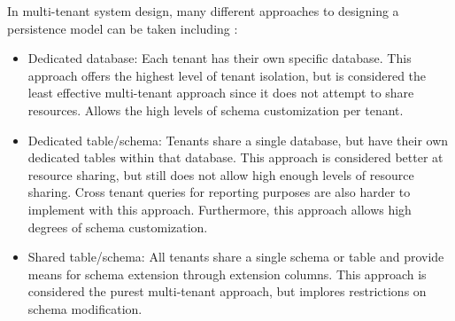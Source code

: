 In multi-tenant system design, many different approaches to designing a persistence model can be taken including \cite{Krebs2012}:

\begin{itemize}
\item Dedicated database: Each tenant has their own specific database. This approach offers the highest level of tenant isolation, but is considered the least effective multi-tenant approach since it does not attempt to share resources. Allows the high levels of schema customization per tenant.
\item Dedicated table/schema: Tenants share a single database, but have their own dedicated tables within that database. This approach is considered better at resource sharing, but still does not allow high enough levels of resource sharing. Cross tenant queries for reporting purposes are also harder to implement with this approach. Furthermore, this approach allows high degrees of schema customization.
\item Shared table/schema: All tenants share a single schema or table and provide means for schema extension through extension columns. This approach is considered the purest multi-tenant approach, but implores restrictions on schema modification.
\end{itemize}


